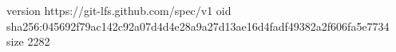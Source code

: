 version https://git-lfs.github.com/spec/v1
oid sha256:045692f79ac142c92a07d4d4e28a9a27d13ae16d4fadf49382a2f606fa5e7734
size 2282
